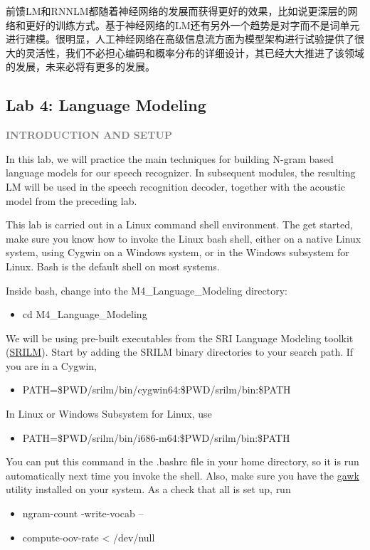 前馈LM和RNNLM都随着神经网络的发展而获得更好的效果，比如说更深层的网络和更好的训练方式。基于神经网络的LM还有另外一个趋势是对字而不是词单元进行建模。很明显，人工神经网络在高级信息流方面为模型架构进行试验提供了很大的灵活性，我们不必担心编码和概率分布的详细设计，其已经大大推进了该领域的发展，未来必将有更多的发展。
\subsection{Lab 4: Language Modeling}
{\bf \textcolor{gray}{INTRODUCTION AND SETUP}}

In this lab, we will practice the main techniques for building N-gram based language models for our speech recognizer. In subsequent modules, the resulting LM will be used in the speech recognition decoder, together with the acoustic model from the preceding lab.

This lab is carried out in a Linux command shell environment. The get started, make sure you know how to invoke the Linux bash shell, either on a native Linux system, using Cygwin on a Windows system, or in the Windows subsystem for Linux. Bash is the default shell on most systems.

Inside bash, change into the M4\_Language\_Modeling directory:
\begin{itemize}
	\item cd M4\_Language\_Modeling
\end{itemize}

We will be using pre-built executables from the SRI Language Modeling toolkit (\href{http://www.speech.sri.com/projects/srilm/}{SRILM}). Start by adding the SRILM binary directories to your search path. If you are in a Cygwin,
\begin{itemize}
	\item PATH=\$PWD/srilm/bin/cygwin64:\$PWD/srilm/bin:\$PATH
\end{itemize}

In Linux or Windows Subsystem for Linux, use
\begin{itemize}
	\item PATH=\$PWD/srilm/bin/i686-m64:\$PWD/srilm/bin:\$PATH
\end{itemize}

You can put this command in the .bashrc file in your home directory, so it is run automatically next time you invoke the shell. Also, make sure you have the \href{http://man7.org/linux/man-pages/man1/gawk.1.html}{gawk} utility installed on your system. As a check that all is set up, run
\begin{itemize}
	\item ngram-count -write-vocab –
	\item compute-oov-rate < /dev/null
\end{itemize}

